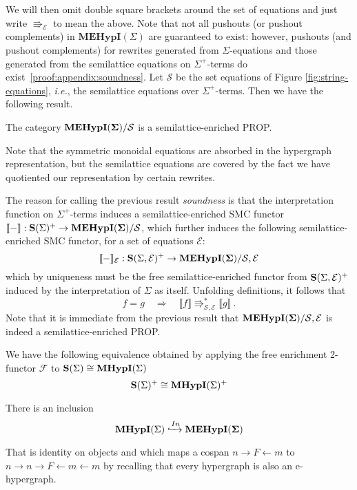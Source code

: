 We will then omit double square brackets around the set of equations and just write $\Rrightarrow_{\mathcal{E}}$ to mean the above.
Note that not all pushouts (or pushout complements) in $\textbf{MEHypI}(\Sigma)$ are guaranteed to exist: however,  pushouts (and pushout complements) for rewrites generated from $\Sigma$-equations and those generated from the semilattice equations on $\Sigma^+$-terms do exist~\ref{proof:appendix:soundness}.
Let $\mathcal{S}$ be the set equations of Figure \ref{fig:string-equations},  \textit{i.e.},  the semilattice equations over $\Sigma^+$-terms. 
Then we have the following result. 
\begin{proposition}[Soundness]
\label{prop:soundness}
The category ${\mathbf{MEHypI(\Sigma)}}/{\mathcal{S}}$ is a semilattice-enriched PROP. 
\end{proposition}
Note that the symmetric monoidal equations are absorbed in the hypergraph representation,  but the semilattice equations are covered by the fact we have quotiented our representation by certain rewrites. 

The reason for calling the previous result \textit{soundness} is that the interpretation function on $\Sigma^+$-terms induces a semilattice-enriched SMC functor $\llbracket - \rrbracket: \mathbf{S}(\Sigma)^{+} \to {\mathbf{MEHypI(\Sigma)}}/{\mathcal{S}}$,  which further induces the following semilattice-enriched SMC functor,  for a set of equations $\mathcal E$:
\[
	\llbracket - \rrbracket_{\mathcal E}: \mathbf{S}(\Sigma, \mathcal E)^{+} \to {\mathbf{MEHypI(\Sigma)}}/{\mathcal{S,E}}
\]
which by uniqueness must be the free semilattice-enriched functor from $\mathbf{S}(\Sigma, \mathcal E)^{+}$ induced by the interpretation of $\Sigma$ as itself.  
Unfolding definitions,  it follows that
\[
	f = g \quad \Rightarrow \quad \llbracket f \rrbracket \Rrightarrow^{*}_{\mathcal{S}, \mathcal{E}} \llbracket g \rrbracket~ . 
\]
Note that it is immediate from the previous result that ${\mathbf{MEHypI(\Sigma)}}/{\mathcal{S,E}}$ is indeed a semilattice-enriched PROP.  

\begin{lemma}
We have the following equivalence obtained by applying the free enrichment 2-functor $\mathcal{F}$ to $\mathbf{S}(\Sigma) \cong \textbf{MHypI}(\Sigma)$
\[
\mathbf{S}(\Sigma)^{+} \cong \textbf{MHypI}(\Sigma)^{+}
\]
\end{lemma}

\begin{lemma}

There is an inclusion
\[
\textbf{MHypI}(\Sigma) \xhookrightarrow{In} {\mathbf{MEHypI(\Sigma)}}
\]

That is identity on objects and which maps a cospan $n \xrightarrow{} F \xleftarrow{} m$ to $n \xrightarrow{} n \xrightarrow{} F \xleftarrow{} m \xleftarrow{} m$ by recalling that every hypergraph is also an e-hypergraph.
\end{lemma}

